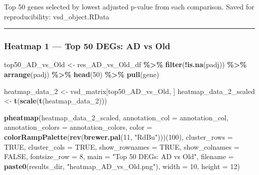 \documentclass[
]{article}
\newenvironment{Shaded}{\begin{snugshade}}{\end{snugshade}}
\newcommand{\AttributeTok}[1]{\textcolor[rgb]{0.13,0.29,0.53}{#1}}
\newcommand{\ConstantTok}[1]{\textcolor[rgb]{0.56,0.35,0.01}{#1}}
\newcommand{\DecValTok}[1]{\textcolor[rgb]{0.00,0.00,0.81}{#1}}
\newcommand{\FunctionTok}[1]{\textcolor[rgb]{0.13,0.29,0.53}{\textbf{#1}}}
\newcommand{\NormalTok}[1]{#1}
\newcommand{\OtherTok}[1]{\textcolor[rgb]{0.56,0.35,0.01}{#1}}
\newcommand{\SpecialCharTok}[1]{\textcolor[rgb]{0.81,0.36,0.00}{\textbf{#1}}}
\newcommand{\StringTok}[1]{\textcolor[rgb]{0.31,0.60,0.02}{#1}}
\begin{document}
Top 50 genes selected by lowest adjusted p-value from each comparison.
Saved for reproducibility: vsd\_object.RData

\begin{center}\rule{0.5\linewidth}{0.5pt}\end{center}

\subsubsection{Heatmap 1 --- Top 50 DEGs: AD vs
Old}\label{heatmap-1-top-50-degs-ad-vs-old}

\begin{Shaded}
\begin{Highlighting}[]
\NormalTok{top50\_AD\_vs\_Old }\OtherTok{\textless{}{-}}\NormalTok{ res\_AD\_vs\_Old\_df }\SpecialCharTok{\%\textgreater{}\%}
    \FunctionTok{filter}\NormalTok{(}\SpecialCharTok{!}\FunctionTok{is.na}\NormalTok{(padj)) }\SpecialCharTok{\%\textgreater{}\%}
    \FunctionTok{arrange}\NormalTok{(padj) }\SpecialCharTok{\%\textgreater{}\%}
    \FunctionTok{head}\NormalTok{(}\DecValTok{50}\NormalTok{) }\SpecialCharTok{\%\textgreater{}\%}
    \FunctionTok{pull}\NormalTok{(gene)}

\NormalTok{heatmap\_data\_2 }\OtherTok{\textless{}{-}}\NormalTok{ vsd\_matrix[top50\_AD\_vs\_Old, ]}
\NormalTok{heatmap\_data\_2\_scaled }\OtherTok{\textless{}{-}} \FunctionTok{t}\NormalTok{(}\FunctionTok{scale}\NormalTok{(}\FunctionTok{t}\NormalTok{(heatmap\_data\_2)))}

\FunctionTok{pheatmap}\NormalTok{(heatmap\_data\_2\_scaled,}
    \AttributeTok{annotation\_col    =}\NormalTok{ annotation\_col,}
    \AttributeTok{annotation\_colors =}\NormalTok{ annotation\_colors,}
    \AttributeTok{color =} \FunctionTok{colorRampPalette}\NormalTok{(}\FunctionTok{rev}\NormalTok{(}\FunctionTok{brewer.pal}\NormalTok{(}\DecValTok{11}\NormalTok{, }\StringTok{"RdBu"}\NormalTok{)))(}\DecValTok{100}\NormalTok{),}
    \AttributeTok{cluster\_rows =} \ConstantTok{TRUE}\NormalTok{, }\AttributeTok{cluster\_cols =} \ConstantTok{TRUE}\NormalTok{,}
    \AttributeTok{show\_rownames =} \ConstantTok{TRUE}\NormalTok{, }\AttributeTok{show\_colnames =} \ConstantTok{FALSE}\NormalTok{,}
    \AttributeTok{fontsize\_row =} \DecValTok{8}\NormalTok{,}
    \AttributeTok{main =} \StringTok{"Top 50 DEGs: AD vs Old"}\NormalTok{,}
    \AttributeTok{filename =} \FunctionTok{paste0}\NormalTok{(results\_dir, }\StringTok{"heatmap\_AD\_vs\_Old.png"}\NormalTok{),}
    \AttributeTok{width =} \DecValTok{10}\NormalTok{, }\AttributeTok{height =} \DecValTok{12}\NormalTok{)}
\end{Highlighting}
\end{Shaded}
\end{document}
